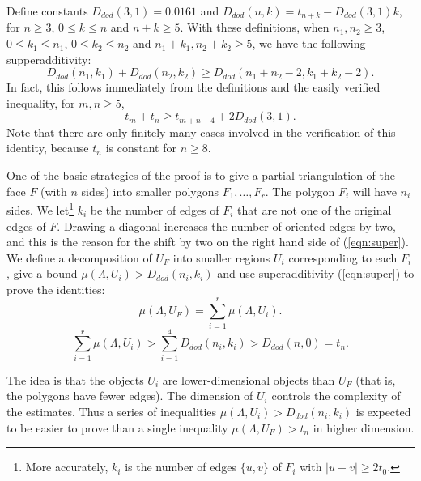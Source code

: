 Define constants $D_{dod}(3,1) = 0.0161$ and $D_{dod}(n,k) = t_{n+k} - D_{dod}(3,1)k$,
for $n\ge 3$, $0\le k\le n$ and $n+k\ge 5$.  With these definitions,
when $n_1,n_2\ge 3$, $0\le k_1\le n_1$, $0\le k_2\le n_2$ and $n_1+k_1,n_2+k_2\ge 5$, we have the following supperadditivity:
\begin{equation}\label{eqn:super}
  D_{dod}(n_1,k_1) + D_{dod}(n_2,k_2) \ge D_{dod}(n_1+n_2-2,k_1+k_2-2).
\end{equation}
In fact, this follows immediately from the definitions and the
easily verified inequality,
for $m,n\ge 5$,
$$
t_m + t_n \ge t_{m+n-4} + 2 D_{dod}(3,1).
$$
Note that there are only finitely many cases involved in the
verification of this identity,
because $t_n$ is constant for $n\ge 8$.


One of the basic strategies of the proof is to give a partial triangulation
of the face $F$ (with $n$ sides)
into smaller polygons $F_1,\ldots,F_r$.   The polygon
$F_i$ will have $n_i$ sides.  We let\footnote{More accurately,
$k_i$ is the number of edges $\{u,v\}$ of $F_i$ with $|u-v|\ge 2t_0$.} 
$k_i$ be the number of edges
of $F_i$ that are not one of the original edges of $F$. 
Drawing a diagonal increases the number of oriented edges by
two, and this is the reason for the shift by two on the right
hand side of (\ref{eqn:super}).   We define
a decomposition of $U_F$ into smaller regions $U_i$ corresponding
to each $F_i$, give a bound $\mu(\Lambda,U_i) > D_{dod}(n_i,k_i)$
and use superadditivity (\ref{eqn:super}) to prove the identities:
\begin{equation}\label{eqn:mu}
  \mu(\Lambda,U_F) = \sum_{i=1}^r \mu(\Lambda,U_i).
\end{equation}
\begin{equation}\label{eqn:super-mu}
\sum_{i=1}^r \mu(\Lambda,U_i) > \sum_{i=1}^4 D_{dod}(n_i,k_i)
 > D_{dod}(n,0) = t_n.
\end{equation}

The idea is that the objects $U_i$ are lower-dimensional objects
than $U_F$ (that is, the polygons  have fewer edges).
The dimension of $U_i$ controls the complexity
of the estimates.  Thus a series of inequalities $\mu(\Lambda,U_i) > D_{dod}(n_i,k_i)$
is expected to be easier to prove than a single inequality
$\mu(\Lambda,U_F) > t_n$ in higher dimension.  

